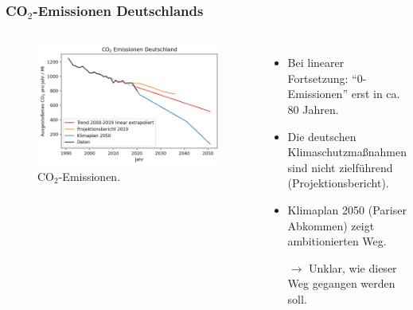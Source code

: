 \begin{frame}
  \frametitle{CO$_2$-Emissionen Deutschlands}
  \begin{columns}
      \begin{figure}
		    \centering
		    \includegraphics[width=\linewidth]{bilder/co2-emissions-de.png}
		    \caption{CO$_2$-Emissionen.}
      \end{figure}
      \begin{itemize}
        \item Bei linearer Fortsetzung: \enquote{0-Emissionen} erst in ca. 80 Jahren.
        \item Die deutschen Klimaschutzmaßnahmen sind nicht zielführend (Projektionsbericht).
        \item Klimaplan 2050 (Pariser Abkommen) zeigt ambitionierten Weg.
        \item[$\rightarrow$] Unklar, wie dieser Weg gegangen werden soll.
      \end{itemize}
    \end{columns}
\end{frame}

